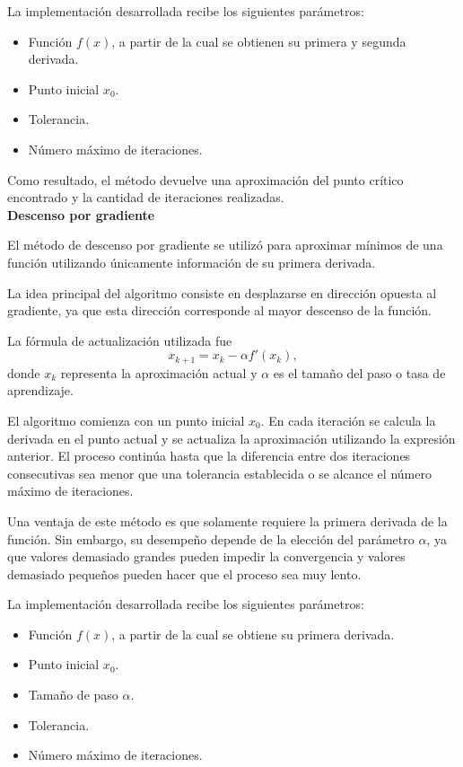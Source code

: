 \documentclass[12pt]{article}
\begin{document}
La implementación desarrollada recibe los siguientes parámetros:

\begin{itemize}
\item Función $f(x)$, a partir de la cual se obtienen su primera y segunda derivada.
\item Punto inicial $x_0$.
\item Tolerancia.
\item Número máximo de iteraciones.
\end{itemize}

Como resultado, el método devuelve una aproximación del punto crítico encontrado y la cantidad de iteraciones realizadas.\\


\textbf{Descenso por gradiente}

El método de descenso por gradiente se utilizó para aproximar mínimos de una función utilizando únicamente información de su primera derivada.

La idea principal del algoritmo consiste en desplazarse en dirección opuesta al gradiente, ya que esta dirección corresponde al mayor descenso de la función.

La fórmula de actualización utilizada fue
\[
x_{k+1} = x_k - \alpha f'(x_k),
\]
donde $x_k$ representa la aproximación actual y $\alpha$ es el tamaño del paso o tasa de aprendizaje.

El algoritmo comienza con un punto inicial $x_0$. En cada iteración se calcula la derivada en el punto actual y se actualiza la aproximación utilizando la expresión anterior. El proceso continúa hasta que la diferencia entre dos iteraciones consecutivas sea menor que una tolerancia establecida o se alcance el número máximo de iteraciones.

Una ventaja de este método es que solamente requiere la primera derivada de la función. Sin embargo, su desempeño depende de la elección del parámetro $\alpha$, ya que valores demasiado grandes pueden impedir la convergencia y valores demasiado pequeños pueden hacer que el proceso sea muy lento.

La implementación desarrollada recibe los siguientes parámetros:

\begin{itemize}
\item Función $f(x)$, a partir de la cual se obtiene su primera derivada.
\item Punto inicial $x_0$.
\item Tamaño de paso $\alpha$.
\item Tolerancia.
\item Número máximo de iteraciones.
\end{itemize}
\end{document}
